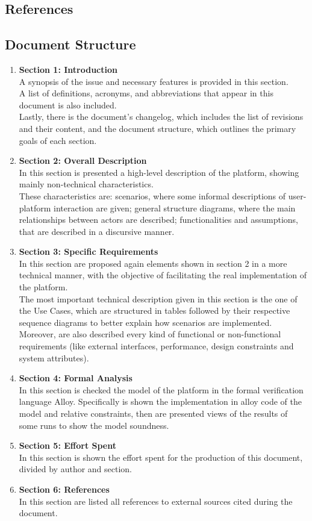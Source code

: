 \subsection{References}

\subsection{Document Structure}
\begin{enumerate}[label=$\bullet$]
    \item \textbf{Section 1: Introduction}\\
    A synopsis of the issue and necessary features is provided in this section.\\
    A list of definitions, acronyms, and abbreviations that appear in this document is also included.\\
    Lastly, there is the document's changelog, which includes the list of revisions and their content, and the document structure, which outlines the primary goals of each section.
    \item \textbf{Section 2: Overall Description}\\
    In this section is presented a high-level description of the platform, showing mainly non-technical characteristics.\\
    These characteristics are: 
    scenarios, where some informal descriptions of user-platform interaction are given; 
    general structure diagrams, where the main relationships between actors are described; 
    functionalities and assumptions, that are described in a discursive manner.
    \item \textbf{Section 3: Specific Requirements}\\
    In this section are proposed again elements shown in section 2 in a more technical manner, with the objective of facilitating the real implementation of the platform.\\
    The most important technical description given in this section is the one of the Use Cases, which are structured in tables followed by their respective sequence diagrams to better explain how scenarios are implemented.\\
    Moreover, are also described every kind of functional or non-functional requirements (like external interfaces, performance, design constraints and system attributes).
    \item \textbf{Section 4: Formal Analysis}\\
    In this section is checked the model of the platform in the formal verification language Alloy.
    Specifically is shown the implementation in alloy code of the model and relative constraints, then are presented views of the results of some runs to show the model soundness.
    \item \textbf{Section 5: Effort Spent}\\
    In this section is shown the effort spent for the production of this document, divided by author and section.
    \item \textbf{Section 6: References}\\
    In this section are listed all references to external sources cited during the document.
\end{enumerate}